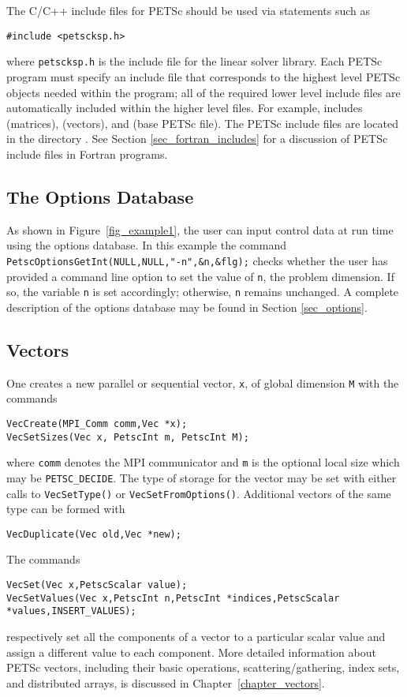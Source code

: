 {{The C/C++ include files for PETSc should be used via statements such as
\begin{lstlisting}
#include <petscksp.h>
\end{lstlisting}
where \lstinline{petscksp.h} is the include file for the linear solver library.
Each PETSc program must specify an
include file that corresponds to the highest level PETSc objects
needed within the program; all of the required lower level include
files are automatically included within the higher level files.  For
example,  includes  (matrices),
 (vectors), and  (base PETSc file).
The PETSc include files are located in the directory
.  See Section \ref{sec_fortran_includes}
for a discussion of PETSc include files in Fortran programs.

\subsection*{The Options Database}

As shown in Figure~\ref{fig_example1}, the user can input control data
at run time using the options database. In this example the command
\lstinline{PetscOptionsGetInt(NULL,NULL,"-n",&n,&flg);} checks whether the user has
provided a command line option to set the value of \lstinline{n}, the
problem dimension.  If so, the variable \lstinline{n} is set accordingly;
otherwise, \lstinline{n} remains unchanged. A complete description of the
options database may be found in Section \ref{sec_options}.

\subsection*{Vectors}
\label{sec_vecintro}

One creates a new parallel or
sequential vector, \lstinline{x}, of global dimension \lstinline{M} with the
commands  
\begin{lstlisting}
VecCreate(MPI_Comm comm,Vec *x);
VecSetSizes(Vec x, PetscInt m, PetscInt M);
\end{lstlisting}
where \lstinline{comm} denotes the MPI communicator and \lstinline{m} is the optional local size
which may be \lstinline{PETSC_DECIDE}. The type of storage
for the vector may be set with either calls to
\lstinline{VecSetType()} or \lstinline{VecSetFromOptions()}.
Additional vectors of the same type can be formed with
\begin{lstlisting}
VecDuplicate(Vec old,Vec *new);
\end{lstlisting}
The commands
\begin{lstlisting}
VecSet(Vec x,PetscScalar value);
VecSetValues(Vec x,PetscInt n,PetscInt *indices,PetscScalar *values,INSERT_VALUES);
\end{lstlisting}
respectively set all the components of a vector to a particular scalar
value and assign a different value to each component.  More
detailed information about PETSc vectors, including their basic
operations, scattering/gathering, index sets, and distributed arrays, is
discussed in Chapter~\ref{chapter_vectors}.

}}
